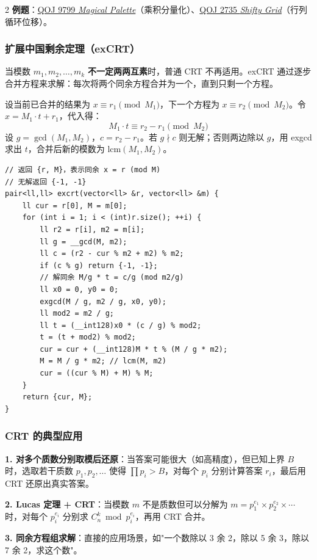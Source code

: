 \begin{multicols*}{2}
		\textbf{例题}：\href{https://vjudge.net/problem/qoj-9799}{QOJ 9799 \emph{Magical Palette}}（乘积分量化）、\href{https://vjudge.net/problem/qoj-2735}{QOJ 2735 \emph{Shifty Grid}}（行列循环位移）。

		\subsubsection{扩展中国剩余定理（exCRT）}

		当模数 $m_1, m_2, \dots, m_k$ \textbf{不一定两两互素}时，普通 CRT 不再适用。exCRT 通过逐步合并方程来求解：每次将两个同余方程合并为一个，直到只剩一个方程。

		设当前已合并的结果为 $x \equiv r_1 \pmod{M_1}$，下一个方程为 $x \equiv r_2 \pmod{M_2}$。令 $x = M_1 \cdot t + r_1$，代入得：
		$$M_1 \cdot t \equiv r_2 - r_1 \pmod{M_2}$$
		设 $g = \gcd(M_1, M_2)$，$c = r_2 - r_1$。若 $g \nmid c$ 则无解；否则两边除以 $g$，用 exgcd 求出 $t$，合并后新的模数为 $\text{lcm}(M_1, M_2)$。

		\begin{verbatim}
// 返回 {r, M}，表示同余 x = r (mod M)
// 无解返回 {-1, -1}
pair<ll,ll> excrt(vector<ll> &r, vector<ll> &m) {
	ll cur = r[0], M = m[0];
	for (int i = 1; i < (int)r.size(); ++i) {
		ll r2 = r[i], m2 = m[i];
		ll g = __gcd(M, m2);
		ll c = (r2 - cur % m2 + m2) % m2;
		if (c % g) return {-1, -1};
		// 解同余 M/g * t = c/g (mod m2/g)
		ll x0 = 0, y0 = 0;
		exgcd(M / g, m2 / g, x0, y0);
		ll mod2 = m2 / g;
		ll t = (__int128)x0 * (c / g) % mod2;
		t = (t + mod2) % mod2;
		cur = cur + (__int128)M * t % (M / g * m2);
		M = M / g * m2; // lcm(M, m2)
		cur = ((cur % M) + M) % M;
	}
	return {cur, M};
}
		\end{verbatim}

		\subsubsection{CRT 的典型应用}

		\textbf{1. 对多个质数分别取模后还原}：当答案可能很大（如高精度），但已知上界 $B$ 时，选取若干质数 $p_1, p_2, \dots$ 使得 $\prod p_i > B$，对每个 $p_i$ 分别计算答案 $r_i$，最后用 CRT 还原出真实答案。

		\textbf{2. Lucas 定理 + CRT}：当模数 $m$ 不是质数但可以分解为 $m = p_1^{e_1} \times p_2^{e_2} \times \cdots$ 时，对每个 $p_i^{e_i}$ 分别求 $C_n^k \bmod p_i^{e_i}$，再用 CRT 合并。

		\textbf{3. 同余方程组求解}：直接的应用场景，如"一个数除以 3 余 2，除以 5 余 3，除以 7 余 2，求这个数"。


\end{multicols*}
